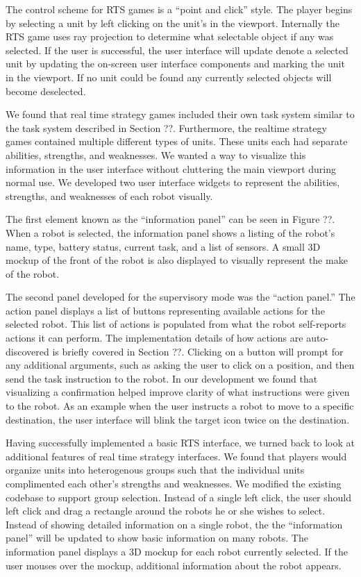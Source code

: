 The control scheme for RTS games is a ``point and click'' style. The player begins by selecting a unit by left clicking on the unit's in the viewport. Internally the RTS game uses ray projection to determine what selectable object if any was selected. If the user is successful, the user interface will update denote a selected unit by updating the on-screen user interface components and marking the unit in the viewport. If no unit could be found any currently selected objects will become deselected.

We found that real time strategy games included their own task system similar to the task system described in Section ??. Furthermore, the realtime strategy games contained multiple different types of units. These units each had separate abilities, strengths, and weaknesses. We wanted a way to visualize this information in the user interface without cluttering the main viewport during normal use. We developed two user interface widgets to represent the abilities, strengths, and weaknesses of each robot visually. 

The first element known as the ``information panel'' can be seen in Figure ??. When a robot is selected, the information panel shows a listing of the robot's name, type, battery status, current task, and a list of sensors. A small 3D mockup of the front of the robot is also displayed to visually represent the make of the robot.

The second panel developed for the supervisory mode was the ``action panel.'' The action panel displays a list of buttons representing available actions for the selected robot. This list of actions is populated from what the robot self-reports actions it can perform. The implementation details of how actions are auto-discovered is briefly covered in Section ??. Clicking on a button will prompt for any additional arguments, such as asking the user to click on a position, and then send the task instruction to the robot. In our development we found that visualizing a confirmation helped improve clarity of what instructions were given to the robot. As an example when the user instructs a robot to move to a specific destination, the user interface will blink the target icon twice on the destination.  

Having successfully implemented a basic RTS interface, we turned back to look at additional features of real time strategy interfaces. We found that players would organize units into heterogenous groups such that the individual units complimented each other's strengths and weaknesses. We modified the existing codebase to support group selection. Instead of a single left click, the user should left click and drag a rectangle around the robots he or she wishes to select. Instead of showing detailed information on a single robot, the the ``information panel'' will be updated to show basic information on many robots. The information panel displays a 3D mockup for each robot currently selected. If the user mouses over the mockup, additional information about the robot appears.

